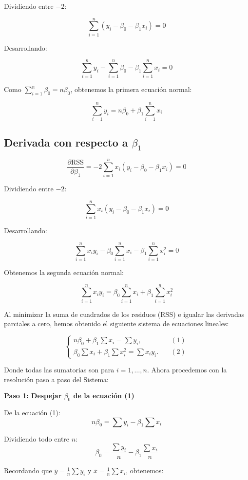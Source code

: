 \documentclass[12pt, a4paper]{article}
\begin{document}
Dividiendo entre $-2$:

\[
\sum_{i=1}^n (y_i - \beta_0 - \beta_1 x_i) = 0
\]

Desarrollando:

\[
\sum_{i=1}^n y_i - \sum_{i=1}^n \beta_0 - \beta_1 \sum_{i=1}^n x_i = 0
\]

Como $\sum_{i=1}^n \beta_0 = n\beta_0$, obtenemos la primera ecuación normal:

\[
\boxed{\sum_{i=1}^n y_i = n\beta_0 + \beta_1 \sum_{i=1}^n x_i}
\]

\subsection*{Derivada con respecto a $\beta_1$}

\[
\frac{\partial \text{RSS}}{\partial \beta_1} = -2 \sum_{i=1}^n x_i (y_i - \beta_0 - \beta_1 x_i) = 0
\]

Dividiendo entre $-2$:

\[
\sum_{i=1}^n x_i (y_i - \beta_0 - \beta_1 x_i) = 0
\]

Desarrollando:

\[
\sum_{i=1}^n x_i y_i - \beta_0 \sum_{i=1}^n x_i - \beta_1 \sum_{i=1}^n x_i^2 = 0
\]

Obtenemos la segunda ecuación normal:

\[
\boxed{\sum_{i=1}^n x_i y_i = \beta_0 \sum_{i=1}^n x_i + \beta_1 \sum_{i=1}^n x_i^2}
\]

Al minimizar la suma de cuadrados de los residuos (RSS) e igualar las derivadas parciales a cero, hemos obtenido el siguiente sistema de ecuaciones lineales:

\[
\begin{cases}
n\beta_0 + \beta_1 \sum x_i = \sum y_i, \quad &(1) \\[1.2em]
\beta_0 \sum x_i + \beta_1 \sum x_i^2 = \sum x_i y_i .\quad &(2)
\end{cases}
\]

Donde todas las sumatorias son para $i=1,\dots,n$. Ahora procedemos con la resolución paso a paso del Sistema:

\textbf{Paso 1: Despejar $\beta_0$ de la ecuación (1)}

De la ecuación (1):
\[
n\beta_0 = \sum y_i - \beta_1 \sum x_i
\]

Dividiendo todo entre $n$:
\[
\beta_0 = \frac{\sum y_i}{n} - \beta_1 \frac{\sum x_i}{n}
\]

Recordando que $\bar{y} = \frac{1}{n}\sum y_i$ y $\bar{x} = \frac{1}{n}\sum x_i$, obtenemos:
\end{document}

